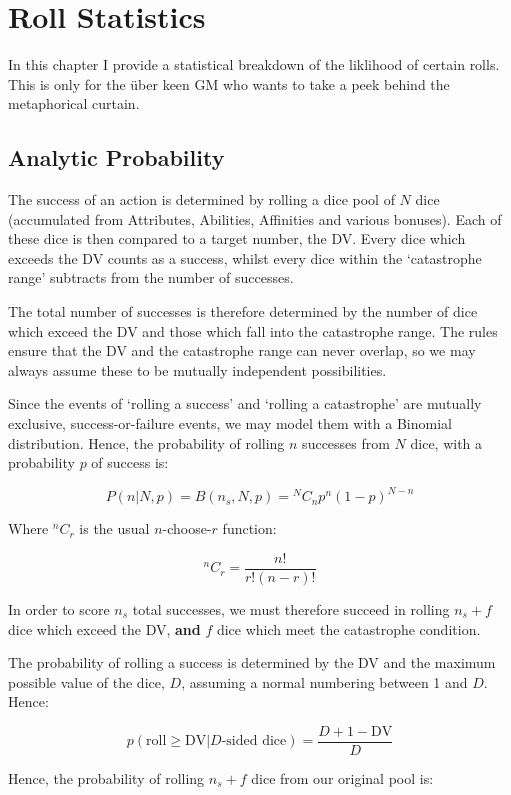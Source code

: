 \chapter{Roll Statistics}

In this chapter I provide a statistical breakdown of the liklihood of certain rolls. This is only for the \"uber keen GM who wants to take a peek behind the metaphorical curtain. 

\section{Analytic Probability}

The success of an action is determined by rolling a dice pool of $N$ dice (accumulated from Attributes, Abilities, Affinities and various bonuses). Each of these dice is then compared to a target number, the DV. Every dice which exceeds the DV counts as a success, whilst every dice within the `catastrophe range' subtracts from the number of successes. 

The total number of successes is therefore determined by the number of dice which exceed the DV and those which fall into the catastrophe range. The rules ensure that the DV and the catastrophe range can never overlap, so we may always assume these to be mutually independent possibilities. 

Since the events of `rolling a success' and `rolling a catastrophe' are mutually exclusive, success-or-failure events, we may model them with a Binomial distribution. Hence, the probability of rolling $n$ successes from $N$ dice, with a probability $p$ of success is:

$$ P(n | N, p) = B(n_s,N,p) = {^N}C_{n} p^{n} (1 - p)^{N - n} $$

Where ${^n}C_r$ is the usual $n$-choose-$r$ function:

$$ {^n}C_r = \frac{n!}{r!(n-r)!} $$

In order to score $n_s$ total successes, we must therefore succeed in rolling $n_s+f$ dice which exceed the DV, {\bf and} $f$ dice which meet the catastrophe condition. 

The probability of rolling a success is determined by the DV and the maximum possible value of the dice, $D$, assuming a normal numbering between 1 and $D$. Hence:

$$ p\left( \text{roll} \geq \text{DV}| D\text{-sided dice}\right ) = \frac{D + 1 - \text{DV}}{D} $$ 

Hence, the probability of rolling $n_s + f$ dice from our original pool is:


